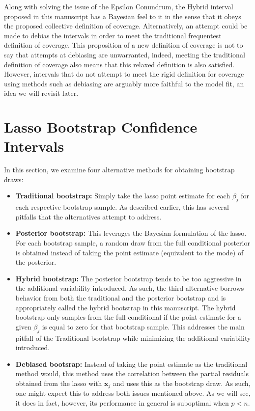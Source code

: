 Along with solving the issue of the Epsilon Conundrum, the Hybrid interval proposed in this manuscript has a Bayesian feel to it in the sense that it obeys the proposed collective definition of coverage. Alternatively, an attempt could be made to debias the intervals in order to meet the traditional frequentest definition of coverage. This proposition of a new definition of coverage is not to say that attempts at debiasing are unwarranted, indeed, meeting the traditional definition of coverage also means that this relaxed definition is also satisfied. However, intervals that do not attempt to meet the rigid definition for coverage using methods such as debiasing are arguably more faithful to the model fit, an idea we will revisit later. 


\section{Lasso Bootstrap Confidence Intervals}


In this section, we examine four alternative methods for obtaining bootstrap draws:
\begin{itemize}
\item \textbf{Traditional bootstrap:} Simply take the lasso point estimate for each $\beta_j$ for each respective bootstrap sample. As described earlier, this has several pitfalls that the alternatives attempt to address.
\item \textbf{Posterior bootstrap:} This leverages the Bayesian formulation of the lasso. For each bootstrap sample, a random draw from the full conditional posterior is obtained instead of taking the point estimate (equivalent to the mode) of the posterior.
\item \textbf{Hybrid bootstrap:} The posterior bootstrap tends to be too aggressive in the additional variability introduced. As such, the third alternative borrows behavior from both the traditional and the posterior bootstrap and is appropriately called the hybrid bootstrap in this manuscript. The hybrid bootstrap only samples from the full conditional if the point estimate for a given $\beta_j$ is equal to zero for that bootstrap sample. This addresses the main pitfall of the Traditional bootstrap while minimizing the additional variability introduced.
\item \textbf{Debiased bootsrap:} Instead of taking the point estimate as the traditional method would, this method uses the correlation between the partial residuals obtained from the lasso with $\boldsymbol{x}_j$ and uses this as the bootstrap draw. As such, one might expect this to address both issues mentioned above. As we will see, it does in fact, however, its performance in general is suboptimal when $p < n$.
\end{itemize}

